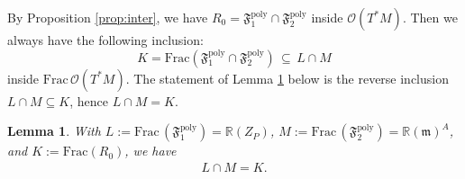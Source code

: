 \documentclass[11pt]{amsart}
\newtheorem{lemma}[theorem]{Lemma}
\theoremstyle{definition}
\theoremstyle{plain}
\theoremstyle{conclusion}
\begin{document}
 By Proposition \ref{prop:inter}, we have $R_0=\mathfrak{F}_1^{\mathrm{poly}}\cap \mathfrak{F}_2^{\mathrm{poly}}$ inside $\mathcal{O}(T^*M)$. %
Then we always have the following inclusion:
\begin{equation}
K=\mathrm{Frac}(\mathfrak{F}_1^{\mathrm{poly}}\cap \mathfrak{F}_2^{\mathrm{poly}})\,\subseteq\, L\cap M   \label{eq:inclusion}
\end{equation} inside  $\mathrm{Frac}\,\mathcal{O}(T^*M)$. The statement of Lemma \ref{lem:LcapM} below is the reverse inclusion $L\cap M\subseteq K$, hence $L\cap M=K$.
  
\begin{lemma} \label{lem:LcapM}
With $L:=\mathrm{Frac} \, \left(\mathfrak{F}_1^{\mathrm{poly}}\right)=\mathbb{R}(Z_P)$, $M:=\mathrm{Frac} \, \left(\mathfrak{F}_2^{\mathrm{poly}}\right)=\mathbb{R}(\mathfrak{m})^A$, and $K:= \mathrm{Frac} \left( R_0\right)$, we have
\begin{align*}
L\cap M=K .
\end{align*}
\end{lemma}
\end{document}
